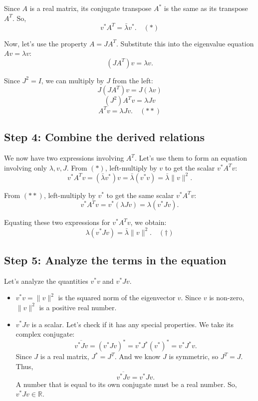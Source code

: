 \documentclass[12pt,a4paper]{article}
\theoremstyle{definition}
\begin{document}
        Since $A$ is a real matrix, its conjugate transpose $A^*$ is the same as its transpose $A^T$. So,
        \[ v^* A^T = \bar{\lambda} v^*. \quad (*) \]

        Now, let's use the property $A = JA^T$. Substitute this into the eigenvalue equation $Av = \lambda v$:
        \[ (JA^T)v = \lambda v. \]

        Since $J^2 = I$, we can multiply by $J$ from the left:
        \[ J(JA^T)v = J(\lambda v) \]
        \[ (J^2)A^T v = \lambda Jv \]
        \[ A^T v = \lambda Jv. \quad (**) \]

        \subsection*{Step 4: Combine the derived relations}

        We now have two expressions involving $A^T$. Let's use them to form an equation involving only $\lambda, v, J$.
        From $(*)$, left-multiply by $v$ to get the scalar $v^* A^T v$:
        \[ v^* A^T v = (\bar{\lambda} v^*) v = \bar{\lambda} (v^* v) = \bar{\lambda} \|v\|^2. \]

        From $(**)$, left-multiply by $v^*$ to get the same scalar $v^* A^T v$:
        \[ v^* A^T v = v^* (\lambda Jv) = \lambda (v^* J v). \]

        Equating these two expressions for $v^* A^T v$, we obtain:
        \[ \lambda (v^* J v) = \bar{\lambda} \|v\|^2. \quad (\dagger) \]

        \subsection*{Step 5: Analyze the terms in the equation}

        Let's analyze the quantities $v^*v$ and $v^*Jv$.
        \begin{itemize}
            \item $v^*v = \|v\|^2$ is the squared norm of the eigenvector $v$. Since $v$ is non-zero, $\|v\|^2$ is a positive real number.
            \item $v^*Jv$ is a scalar. Let's check if it has any special properties. We take its complex conjugate:
            \[ \overline{v^* J v} = (v^* J v)^* = v^* J^* (v^*)^* = v^* J^* v. \]
            Since $J$ is a real matrix, $J^* = J^T$. And we know $J$ is symmetric, so $J^T = J$. Thus,
            \[ \overline{v^* J v} = v^* J v. \]
            A number that is equal to its own conjugate must be a real number. So, $v^*Jv \in \mathbb{R}$.
        \end{itemize}
\end{document}
